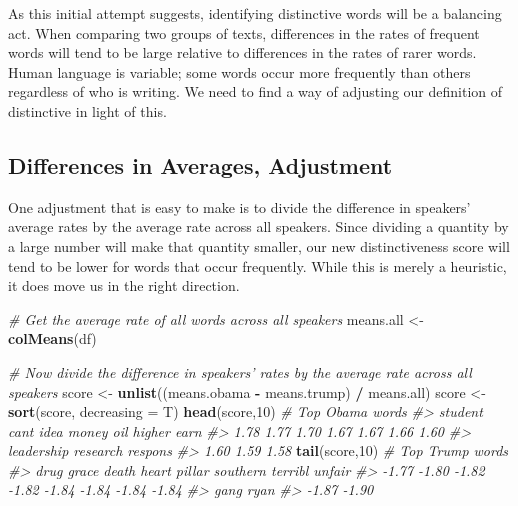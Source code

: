 \documentclass[]{book}
\newenvironment{Shaded}{\begin{snugshade}}{\end{snugshade}}
\newcommand{\KeywordTok}[1]{\textcolor[rgb]{0.13,0.29,0.53}{\textbf{#1}}}
\newcommand{\DataTypeTok}[1]{\textcolor[rgb]{0.13,0.29,0.53}{#1}}
\newcommand{\DecValTok}[1]{\textcolor[rgb]{0.00,0.00,0.81}{#1}}
\newcommand{\StringTok}[1]{\textcolor[rgb]{0.31,0.60,0.02}{#1}}
\newcommand{\CommentTok}[1]{\textcolor[rgb]{0.56,0.35,0.01}{\textit{#1}}}
\newcommand{\OperatorTok}[1]{\textcolor[rgb]{0.81,0.36,0.00}{\textbf{#1}}}
\newcommand{\NormalTok}[1]{#1}
\begin{document}
As this initial attempt suggests, identifying distinctive words will be
a balancing act. When comparing two groups of texts, differences in the
rates of frequent words will tend to be large relative to differences in
the rates of rarer words. Human language is variable; some words occur
more frequently than others regardless of who is writing. We need to
find a way of adjusting our definition of distinctive in light of this.

\subsection{Differences in Averages,
Adjustment}\label{differences-in-averages-adjustment}

One adjustment that is easy to make is to divide the difference in
speakers' average rates by the average rate across all speakers. Since
dividing a quantity by a large number will make that quantity smaller,
our new distinctiveness score will tend to be lower for words that occur
frequently. While this is merely a heuristic, it does move us in the
right direction.

\begin{Shaded}
\begin{Highlighting}[]
\CommentTok{# Get the average rate of all words across all speakers}
\NormalTok{means.all <-}\StringTok{ }\KeywordTok{colMeans}\NormalTok{(df)}

\CommentTok{# Now divide the difference in speakers' rates by the average rate across all speakers}
\NormalTok{score <-}\StringTok{ }\KeywordTok{unlist}\NormalTok{((means.obama }\OperatorTok{-}\StringTok{ }\NormalTok{means.trump) }\OperatorTok{/}\StringTok{ }\NormalTok{means.all)}
\NormalTok{score <-}\StringTok{ }\KeywordTok{sort}\NormalTok{(score, }\DataTypeTok{decreasing =}\NormalTok{ T)}
\KeywordTok{head}\NormalTok{(score,}\DecValTok{10}\NormalTok{) }\CommentTok{# Top Obama words}
\CommentTok{#>    student       cant       idea      money        oil     higher       earn }
\CommentTok{#>       1.78       1.77       1.70       1.67       1.67       1.66       1.60 }
\CommentTok{#> leadership   research    respons }
\CommentTok{#>       1.60       1.59       1.58}
\KeywordTok{tail}\NormalTok{(score,}\DecValTok{10}\NormalTok{) }\CommentTok{# Top Trump words}
\CommentTok{#>     drug    grace    death    heart   pillar southern  terribl   unfair }
\CommentTok{#>    -1.77    -1.80    -1.82    -1.82    -1.84    -1.84    -1.84    -1.84 }
\CommentTok{#>     gang     ryan }
\CommentTok{#>    -1.87    -1.90}
\end{Highlighting}
\end{Shaded}
\end{document}
